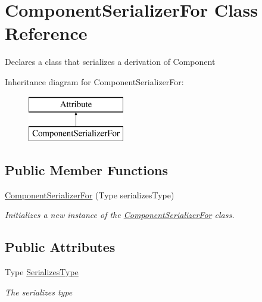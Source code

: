\hypertarget{class_component_serializer_for}{}\section{Component\+Serializer\+For Class Reference}
\label{class_component_serializer_for}


Declares a class that serializes a derivation of Component  


Inheritance diagram for Component\+Serializer\+For\+:\begin{figure}[H]
\begin{center}
\leavevmode
\includegraphics[height=2.000000cm]{class_component_serializer_for}
\end{center}
\end{figure}
\subsection*{Public Member Functions}
\begin{DoxyCompactItemize}
\item 
\hyperlink{class_component_serializer_for_a3a972befbb46f38eb0cff0efe4081476}{Component\+Serializer\+For} (Type serializes\+Type)
\begin{DoxyCompactList}\small\item\em Initializes a new instance of the \hyperlink{class_component_serializer_for}{Component\+Serializer\+For} class. \end{DoxyCompactList}\end{DoxyCompactItemize}
\subsection*{Public Attributes}
\begin{DoxyCompactItemize}
\item 
Type \hyperlink{class_component_serializer_for_a1f14524b26bf8afa0679193bda8124bf}{Serializes\+Type}
\begin{DoxyCompactList}\small\item\em The serializes type \end{DoxyCompactList}\end{DoxyCompactItemize}


